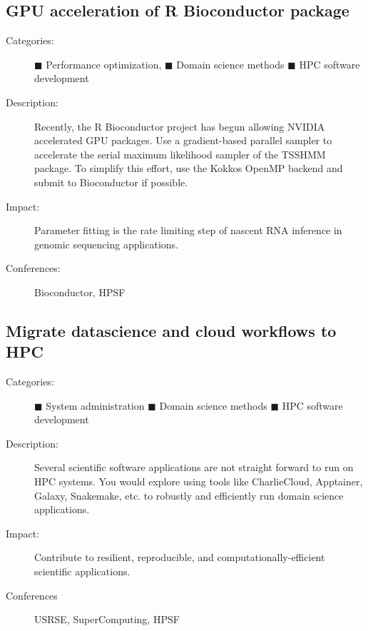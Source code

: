 \documentclass[12pt]{article}
\begin{document}
\subsection{GPU acceleration of R Bioconductor package}
\begin{description}
\item[Categories:]
  \textcolor{orange!90!black}{$\blacksquare$} Performance optimization,
  \textcolor{green!50!black}{$\blacksquare$} Domain science methods
  \textcolor{blue!80!black}{$\blacksquare$} HPC software development
\item[Description:] Recently, %
  the R Bioconductor project has begun allowing NVIDIA accelerated %
  GPU packages.
  Use a gradient-based parallel sampler %
  to accelerate the serial maximum likelihood sampler %
  of the TSSHMM package.
  To simplify this effort, %
  use the Kokkos OpenMP backend %
  and submit to Bioconductor if possible.
\item[Impact:] Parameter fitting is the rate limiting step %
  of nascent RNA inference %
  in genomic sequencing applications.
\item[Conferences:] Bioconductor, HPSF
\end{description}

\subsection{Migrate datascience and cloud workflows to HPC}
\begin{description}
\item[Categories:]
  \textcolor{black!60}{$\blacksquare$} System administration
  \textcolor{green!50!black}{$\blacksquare$} Domain science methods
  \textcolor{blue!80!black}{$\blacksquare$} HPC software development
\item[Description:] Several scientific software applications %
  are not straight forward to run on HPC systems.
  You would explore using tools like %
  CharlieCloud, %
  Apptainer, %
  Galaxy, %
  Snakemake, etc. %
  to robustly and efficiently run domain science applications.
\item[Impact:] Contribute to %
  resilient, reproducible, and computationally-efficient %
  scientific applications.
\item[Conferences] USRSE, SuperComputing, HPSF
\end{description}

\printbibliography[heading=none]{}%
\label{mylastpage}
\end{document}
